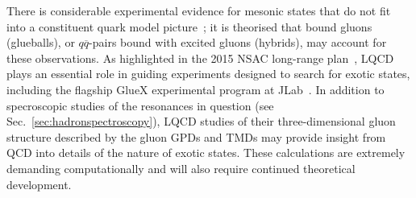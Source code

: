 There is considerable experimental evidence for mesonic states that do not fit into a constituent quark model picture~\cite{Patrignani:2016xqp}; it is theorised that bound gluons (glueballs), or $q\overline{q}$-pairs bound with excited gluons (hybrids), may account for these observations. 
As highlighted in the 2015 NSAC long-range plan~\cite{Geesaman:2015fha}, LQCD plays an essential role in guiding experiments designed to search for exotic states, including the flagship GlueX experimental program at JLab~\cite{Dobbs:2017vjw}. In addition to specroscopic studies of the resonances in question 
(see Sec.~\ref{sec:hadronspectroscopy}), LQCD studies of their three-dimensional gluon structure described by the gluon GPDs and TMDs may provide insight from QCD into details of the nature of exotic states. These calculations are extremely demanding computationally and will also require continued theoretical development.
